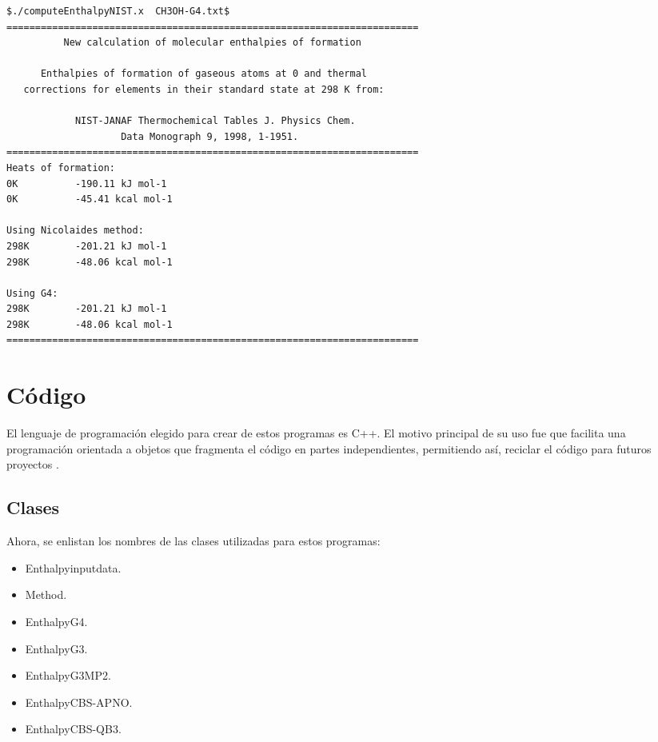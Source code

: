 \begin{lstlisting}[caption = Output de CH3OH-G4.txt en EnthalpyNIST]
$./computeEnthalpyNIST.x  CH3OH-G4.txt$
========================================================================
          New calculation of molecular enthalpies of formation

      Enthalpies of formation of gaseous atoms at 0 and thermal 
   corrections for elements in their standard state at 298 K from:

            NIST-JANAF Thermochemical Tables J. Physics Chem. 
                    Data Monograph 9, 1998, 1-1951.
========================================================================
Heats of formation:
0K          -190.11 kJ mol-1
0K          -45.41 kcal mol-1

Using Nicolaides method:
298K        -201.21 kJ mol-1
298K        -48.06 kcal mol-1

Using G4: 
298K        -201.21 kJ mol-1
298K        -48.06 kcal mol-1
========================================================================
\end{lstlisting}

\section{Código}
El lenguaje de programación elegido para crear de estos programas es C++. El motivo principal de su uso fue que facilita una programación orientada a objetos que fragmenta el código en partes independientes, permitiendo así, reciclar el código para futuros proyectos \cite{cplusplus2005, Deitel2014, Pitt2017}.

\subsection*{Clases}
Ahora, se enlistan los nombres de las clases utilizadas para estos programas:
\begin{multicols}{2}
\begin{itemize}
	\item Enthalpyinputdata.
	\item Method.
	\item EnthalpyG4.
	\item EnthalpyG3.
	\item EnthalpyG3MP2.
	\item EnthalpyCBS-APNO.
	\item EnthalpyCBS-QB3.
\end{itemize}
\end{multicols}

